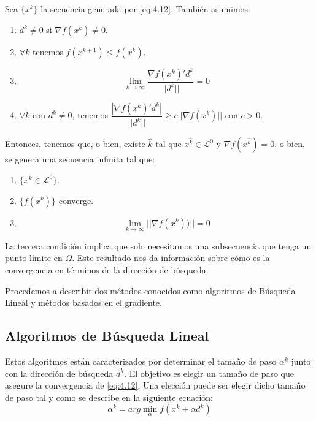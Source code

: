 \begin{proposicion}
Sea $\{x^k\}$ la secuencia generada por \ref{eq:4.12}. 
También asumimos:
\begin{enumerate}
	\item $d^k \neq 0$ si $\nabla f(x^k)\neq 0$.
	\item $\forall k$ tenemos $f(x^{k+1}) \leq f(x^k)$.
	\item \begin{equation}
	\lim_{k\xrightarrow{}{}\infty}\dfrac{\nabla f(x^k)'d^k}{||d^k||} = 0
	\label{eq:4.13}
	\end{equation}
	\item $\forall k$ con $d^k\neq 0$, tenemos $\dfrac{|\nabla f(x^k)'d^k|}{||d^k||} \geq c||\nabla f(x^k)||$ con $c>0$.
\end{enumerate}
Entonces, tenemos que, o bien, existe $\hat{k}$ tal que $x^{\hat{k}}\in\mathcal{L}^0$ y $\nabla f(x^{\hat{k}}) = 0$, o bien, se genera una secuencia infinita tal que:
\begin{enumerate}
	\item $\{x^k\in\mathcal{L}^0\}$.
	\item $\{f(x^k)\}$ converge.
	\item \begin{equation}
	\lim_{k\xrightarrow{}{}\infty} ||\nabla f(x^k))|| = 0
	\label{eq:4.14}
	\end{equation}
\end{enumerate}
\end{proposicion}

La tercera condición implica que solo necesitamos una subsecuencia que tenga un punto límite en $\Omega$. 
Este resultado nos da información sobre cómo es la convergencia en términos de la dirección de búsqueda.

Procedemos a describir dos métodos conocidos como algoritmos de Búsqueda Lineal y métodos basados en el gradiente.

\subsection{Algoritmos de Búsqueda Lineal}

Estos algoritmos están caracterizados por determinar el tamaño de paso $\alpha^k$ junto con la dirección de búsqueda $d^k$. 
El objetivo es elegir un tamaño de paso que asegure la convergencia de \ref{eq:4.12}. 
Una elección puede ser elegir dicho tamaño de paso tal y como se describe en la siguiente ecuación:
\begin{equation*}
\alpha^k = arg \min_\alpha f(x^k+\alpha d^k)
\end{equation*}

